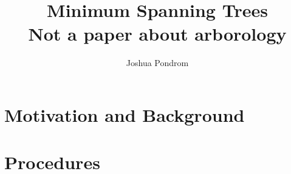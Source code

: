 \documentclass{article}
\begin{document}
\title{Minimum Spanning Trees\\\large Not a paper about arborology}
\author{Joshua Pondrom}
\maketitle

\section{Motivation and Background}
\section{Procedures}
\end{document}
